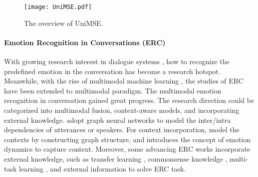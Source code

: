 \documentclass[11pt]{article}
\begin{document}
\begin{figure*}[t]
\centerline{\texttt{[image: UniMSE.pdf]}}
\caption{The overview of UniMSE.}
\label{fig:architecture}
\end{figure*}

\paragraph{Emotion Recognition in Conversations (ERC)}
With growing research interest in dialogue systems \cite{dai2021preview, dai2020learning, dai2020survey, lin2019deep, lin2019post, lin2020discovering, zhang-etal-2022-slot}, how to recognize the predefined emotion in the conversation has become a research hotspot. Meanwhile, with the rise of multimodal machine learning \cite{mao2022m, yuan2021transformer, yu2021learning, zhang2022mintrec, lin2022duplex}, the studies of ERC have been extended to multimodal paradigm. The multimodal emotion recognition in conversation gained great progress. The research direction could be categorized into multimodal fusion, context-aware models, and incorporating external knowledge. \citet{DBLP:conf/icassp/HuHWJM22, DBLP:conf/acl/HuLZJ20, DBLP:journals/corr/abs-2205-02455} adopt graph neural networks to model the inter/intra dependencies of utterances or speakers. For context incorporation, \citet{DBLP:conf/emnlp/SunYF21,DBLP:conf/emnlp/Li00W21,DBLP:conf/emnlp/GhosalMPCG19} model the contexts by constructing graph structure, and \citet{DBLP:conf/emnlp/Mao0WGL21} introduces the concept of emotion dynamics to capture context. Moreover, some advancing ERC works incorporate external knowledge, such as transfer learning \cite{DBLP:journals/corr/abs-1910-04980,DBLP:journals/corr/abs-2108-11626}, commonsense knowledge \cite{DBLP:conf/emnlp/GhosalMGMP20}, multi-task learning \cite{DBLP:conf/naacl/AkhtarCGPEB19}, and external information \cite{DBLP:conf/acl/ZhuP0ZH20} to solve ERC task.
\end{document}
